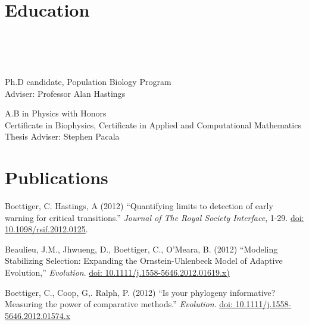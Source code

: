 \documentclass[margin]{res}
\begin{document}
\begin{resume}


\section{Education}
\begin{format}
\\\\
\body\\
\end{format}

\begin{position}
Ph.D candidate, Population Biology Program\\
Adviser: Professor Alan Hastings
\end{position}

\begin{position}
A.B  in Physics with Honors \\ 
Certificate in Biophysics, Certificate in Applied and Computational Mathematics\\
Thesis Adviser: Stephen Pacala 
\end{position}

\section{Publications}

Boettiger, C. Hastings, A (2012) ``Quantifying limits to detection of early warning for critical transitions.'' {\it Journal of The Royal Society Interface}, 1-29. \href{http://dx.doi.org/10.1098/rsif.2012.0125}{doi: 10.1098/rsif.2012.0125}.

Beaulieu, J.M., Jhwueng, D., Boettiger, C., O'Meara, B. (2012) ``Modeling Stabilizing Selection: Expanding the Ornstein-Uhlenbeck Model of Adaptive Evolution,'' {\it Evolution}. \href{http://dx.doi.org/10.1111/j.1558-5646.2012.01619.x}{doi: 10.1111/j.1558-5646.2012.01619.x)}

Boettiger, C., Coop, G,. Ralph, P. (2012) ``Is your phylogeny informative? Measuring the power of comparative methods.'' {\it Evolution}. \href{http://dx.doi.org/10.1111/j.1558-5646.2012.01574.x}{doi: 10.1111/j.1558-5646.2012.01574.x}


\end{resume}
\end{document}
